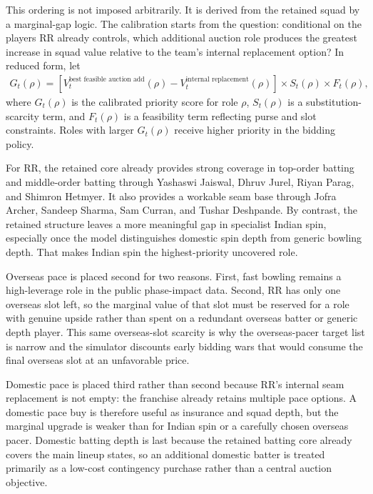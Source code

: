 \documentclass[11pt]{article}
\begin{document}
This ordering is not imposed arbitrarily. It is derived from the retained squad by a marginal-gap logic. The calibration starts from the question: conditional on the players RR already controls, which additional auction role produces the greatest increase in squad value relative to the team's internal replacement option? In reduced form, let
\begin{align}
G_t(\rho)=\left[V_t^{\text{best feasible auction add}}(\rho)-V_t^{\text{internal replacement}}(\rho)\right]\times S_t(\rho)\times F_t(\rho),
\end{align}
where \(G_t(\rho)\) is the calibrated priority score for role \(\rho\), \(S_t(\rho)\) is a substitution-scarcity term, and \(F_t(\rho)\) is a feasibility term reflecting purse and slot constraints. Roles with larger \(G_t(\rho)\) receive higher priority in the bidding policy.

For RR, the retained core already provides strong coverage in top-order batting and middle-order batting through Yashaswi Jaiswal, Dhruv Jurel, Riyan Parag, and Shimron Hetmyer. It also provides a workable seam base through Jofra Archer, Sandeep Sharma, Sam Curran, and Tushar Deshpande. By contrast, the retained structure leaves a more meaningful gap in specialist Indian spin, especially once the model distinguishes domestic spin depth from generic bowling depth. That makes Indian spin the highest-priority uncovered role.

Overseas pace is placed second for two reasons. First, fast bowling remains a high-leverage role in the public phase-impact data. Second, RR has only one overseas slot left, so the marginal value of that slot must be reserved for a role with genuine upside rather than spent on a redundant overseas batter or generic depth player. This same overseas-slot scarcity is why the overseas-pacer target list is narrow and the simulator discounts early bidding wars that would consume the final overseas slot at an unfavorable price.

Domestic pace is placed third rather than second because RR's internal seam replacement is not empty: the franchise already retains multiple pace options. A domestic pace buy is therefore useful as insurance and squad depth, but the marginal upgrade is weaker than for Indian spin or a carefully chosen overseas pacer. Domestic batting depth is last because the retained batting core already covers the main lineup states, so an additional domestic batter is treated primarily as a low-cost contingency purchase rather than a central auction objective.
\end{document}
